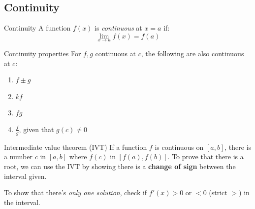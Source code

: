 \documentclass{article}
\begin{document}
\subsection{Continuity}
\begin{definition}
    {Continuity}
    A function $f(x)$ is \emph{continuous} at $x=a$ if:
    \[\mathop {\lim }\limits_{x \to a} f\left( x \right) = f\left( a \right)\]
\end{definition}
\begin{knBox}
    {Continuity properties}
    For $f,g$ continuous at $c$, the following are also continuous at $c$:
    \begin{enumerate}
        \item $f \pm g$
        \item $kf$
        \item $fg$
        \item $\frac{f}{g}$, given that $g(c)\ne 0$
    \end{enumerate}
\end{knBox}
\begin{theorem}
    {Intermediate value theorem (IVT)}
    If a function $f$ is continuous on $[a, b]$, there is a number $c$ in $[a, b]$ where $f(c)$ in $[f(a), f(b)]$.
    \tcblower
    To prove that there is a root, we can use the IVT by showing there is a \textbf{change of sign} between the interval given.

    To show that there's \emph{only one solution}, check if $f'(x) > 0$ or $<0$ (strict $>$) in the interval.
\end{theorem}
\end{document}
